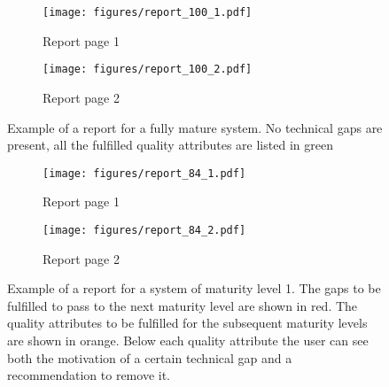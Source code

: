 
\begin{figure*}[h]
 \begin{subfigure}{0.48\textwidth}
    \centering
    \texttt{[image: figures/report\_100\_1.pdf]}
    \caption{Report page 1}
\end{subfigure}
  \hspace*{\fill}   %
\begin{subfigure}{0.48\textwidth}
    \centering
    \texttt{[image: figures/report\_100\_2.pdf]}
    \caption{Report page 2}
\end{subfigure}
\caption{Example of a report for a fully mature system. No technical gaps are present, all the fulfilled quality attributes are listed in green}
\label{report_100}
\end{figure*}

\begin{figure*}[h]
 \begin{subfigure}{0.48\textwidth}
    \centering
    \texttt{[image: figures/report\_84\_1.pdf]}
    \caption{Report page 1}
\end{subfigure}
  \hspace*{\fill}   %
\begin{subfigure}{0.48\textwidth}
    \centering
    \texttt{[image: figures/report\_84\_2.pdf]}
    \caption{Report page 2}
\end{subfigure}
\caption{Example of a report for a system of maturity level 1. The gaps to be fulfilled to pass to the next maturity level are shown in red. The quality attributes to be fulfilled for the subsequent maturity levels are shown in orange. Below each quality attribute the user can see both the motivation of a certain technical gap and a recommendation to remove it.}
\label{report_84}
\end{figure*}
